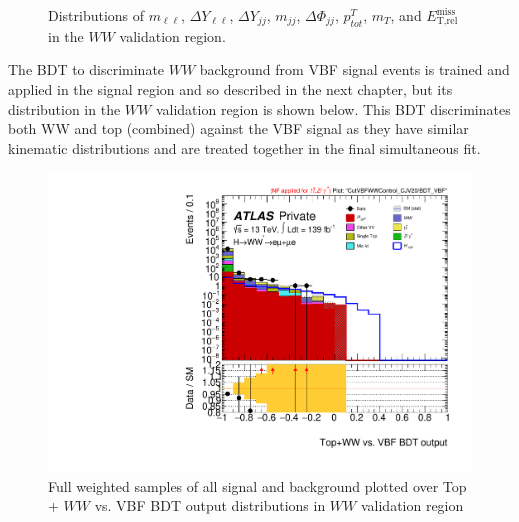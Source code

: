 \begin{figure}[!h]
{  }\hfill
  \hfill
  \hfill
{\caption{Distributions of $m_{\ell\ell}$, $\Delta Y_{\ell\ell}$, $\Delta Y_{jj}$, $m_{jj}$, $\Delta\Phi_{jj}$, $p^T_{tot}$, $m_T$, and $\ensuremath{E_{\text{T,rel}}^{\text{miss}}}$ in the $WW$ validation region.
\label{fig:WWCR3}}}
\end{figure}

The BDT to discriminate $WW$ background from VBF signal events is trained and applied in the signal region and so described in the next chapter, but its distribution in the $WW$ validation region is shown below. This BDT discriminates both WW and top (combined) against the VBF signal as they have similar kinematic distributions and are treated together in the final simultaneous fit.

\begin{figure}[!htbp]
\centering
\includegraphics[width=.6\linewidth]{Pictures/run2-emme-CutVBFWWControl_CJV20-BDT_VBF-log.pdf}
\caption{Full weighted samples of all signal and background plotted over Top + $WW$ vs. VBF BDT output distributions in $WW$ validation region}
\label{fig:VBFWWTopBDTVR}
\end{figure}

